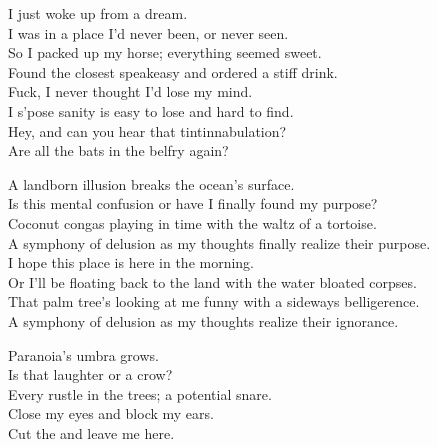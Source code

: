 
\label{album:phantom-island}





I just woke up from a dream. \\
I was in a place I'd never been, or never seen. \\
So I packed up my horse; everything seemed sweet. \\
Found the closest speakeasy and ordered a stiff drink. \\

Fuck, I never thought I'd lose my mind. \\
I s'pose sanity is easy to lose and hard to find. \\
Hey, and can you hear that tintinnabulation? \\
Are all the bats in the belfry again? \\


A landborn illusion breaks the ocean's surface. \\
Is this mental confusion or have I finally found my purpose? \\
Coconut congas playing in time with the waltz of a tortoise. \\
A symphony of delusion as my thoughts finally realize their purpose. \\
I hope this place is here in the morning. \\
Or I'll be floating back to the land with the water bloated corpses. \\
That palm tree's looking at me funny with a sideways belligerence. \\
A symphony of delusion as my thoughts realize their ignorance. \\


Paranoia's umbra grows. \\
Is that laughter or a crow? \\
Every rustle in the trees; a potential snare. \\
Close my eyes and block my ears. \\
Cut the  and leave me here. \\

